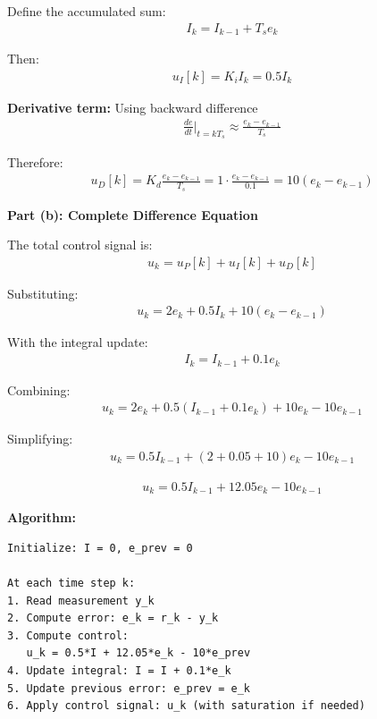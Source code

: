 \documentclass[11pt,a4paper]{article}
\begin{document}
Define the accumulated sum:
\begin{align}
  I_k = I_{k-1} + T_s e_k
\end{align}

Then:
\begin{align}
  u_I[k] = K_i I_k = 0.5 I_k
\end{align}

\textbf{Derivative term:} Using backward difference
\begin{align}
  \frac{de}{dt}\bigg|_{t=kT_s} \approx \frac{e_k - e_{k-1}}{T_s}
\end{align}

Therefore:
\begin{align}
  u_D[k] = K_d \frac{e_k - e_{k-1}}{T_s} = 1 \cdot \frac{e_k - e_{k-1}}{0.1} = 10(e_k - e_{k-1})
\end{align}

\textbf{Part (b): Complete Difference Equation}

The total control signal is:
\begin{align}
  u_k = u_P[k] + u_I[k] + u_D[k]
\end{align}

Substituting:
\begin{align}
  u_k = 2e_k + 0.5I_k + 10(e_k - e_{k-1})
\end{align}

With the integral update:
\begin{align}
  I_k = I_{k-1} + 0.1e_k
\end{align}

Combining:
\begin{align}
  u_k = 2e_k + 0.5(I_{k-1} + 0.1e_k) + 10e_k - 10e_{k-1}
\end{align}

Simplifying:
\begin{align}
  u_k = 0.5I_{k-1} + (2 + 0.05 + 10)e_k - 10e_{k-1}
\end{align}

\begin{align}
  u_k = 0.5I_{k-1} + 12.05e_k - 10e_{k-1}
\end{align}

\textbf{Algorithm:}

\begin{verbatim}
Initialize: I = 0, e_prev = 0

At each time step k:
1. Read measurement y_k
2. Compute error: e_k = r_k - y_k
3. Compute control:
   u_k = 0.5*I + 12.05*e_k - 10*e_prev
4. Update integral: I = I + 0.1*e_k
5. Update previous error: e_prev = e_k
6. Apply control signal: u_k (with saturation if needed)
\end{verbatim}
\end{document}
